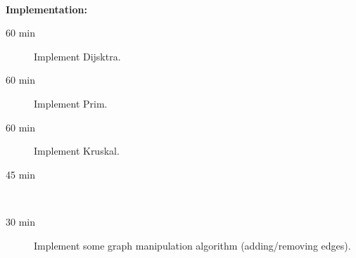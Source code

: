 \hfill\\
\textbf{Implementation:}\\
\begin{description}
	\item[60 min] Implement Dijsktra.
	\item[60 min] Implement Prim.
	\item[60 min] Implement Kruskal.
	\item[45 min] \hfill\\
	\item[30 min] Implement some graph manipulation algorithm (adding/removing edges).
\end{description}
